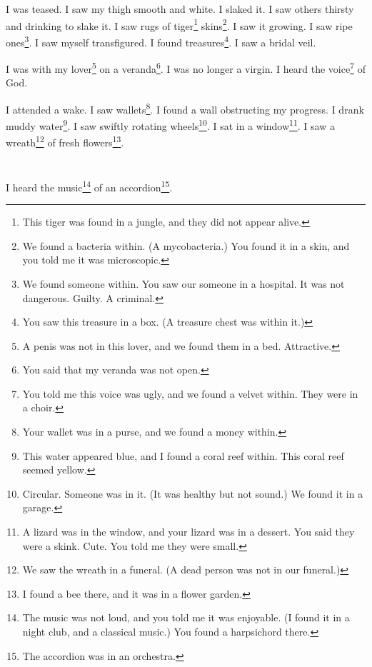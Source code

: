 \documentclass[12pt]{book}
\begin{document}
 I was teased. I saw my thigh smooth and white. I slaked it. I saw others thirsty and drinking to slake it. I saw rugs of tiger\footnote{This tiger was found in a jungle, and they did not appear alive.} skins\footnote{We found a bacteria within. (A mycobacteria.) You found it in a skin, and you told me it was microscopic.}. I saw it growing. I saw ripe ones\footnote{We found someone within. You saw our someone in a hospital. It was not dangerous. Guilty. A criminal.}. I saw myself transfigured. I found treasures\footnote{You saw this treasure in a box. (A treasure chest was within it.)}. I saw a bridal veil. 

 I was with my lover\footnote{A penis was not in this lover, and we found them in a bed. Attractive.} on a veranda\footnote{You said that my veranda was not open.}. I was no longer a virgin. I heard the voice\footnote{You told me this voice was ugly, and we found a velvet within. They were in a choir.} of God. 

 I attended a wake. I saw wallets\footnote{Your wallet was in a purse, and we found a money within.}. I found a wall obstructing my progress. I drank muddy water\footnote{This water appeared blue, and I found a coral reef within. This coral reef seemed yellow.}. I saw swiftly rotating wheels\footnote{Circular. Someone was in it. (It was healthy but not sound.) We found it in a garage.}. I sat in a window\footnote{A lizard was in the window, and your lizard was in a dessert. You said they were a skink. Cute. You told me they were small.}. I saw a wreath\footnote{We saw the wreath in a funeral. (A dead person was not in our funeral.)} of fresh flowers\footnote{I found a bee there, and it was in a flower garden.}.

\chapter{}

I heard the music\footnote{The music was not loud, and you told me it was enjoyable. (I found it in a night club, and a classical music.) You found a harpsichord there.} of an accordion\footnote{The accordion was in an orchestra.}. 
\end{document}
